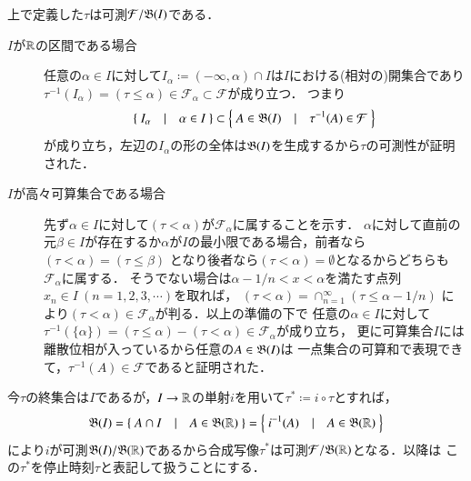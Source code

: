 	\begin{itembox}[l]{}
		\begin{rem}[停止時刻は可測]
			上で定義した$\tau$は可測$\mathcal{F}/\mathfrak{B}(I)$である．
		\end{rem}
	\end{itembox}
	\begin{prf}\mbox{}
		\begin{description}
			\item[$I$が$\mathbb{R}$の区間である場合]
				任意の$\alpha \in I$に対して$I_\alpha \coloneqq (-\infty,\alpha) \cap I$は$I$における(相対の)開集合であり
				$\tau^{-1}(I_\alpha) = (\tau \leq \alpha) \in \mathcal{F}_\alpha \subset \mathcal{F}$が成り立つ．
				つまり
				\begin{align}
					\left\{\ I_\alpha\quad |\quad \alpha \in I\ \right\} \subset \left\{\ A \in \mathfrak{B}(I)\quad |\quad \tau^{-1}(A) \in \mathcal{F}\ \right\}
					\label{eq:stopping_time_mble}
				\end{align}
				が成り立ち，左辺の$I_\alpha$の形の全体は$\mathfrak{B}(I)$を生成するから$\tau$の可測性が証明された．
				
			\item[$I$が高々可算集合である場合]
				先ず$\alpha \in I$に対して$(\tau < \alpha)$が$\mathcal{F}_\alpha$に属することを示す．
				$\alpha$に対して直前の元$\beta \in I$が存在するか$\alpha$が$I$の最小限である場合，前者なら$(\tau < \alpha) = (\tau \leq \beta)$
				となり後者なら$(\tau < \alpha) = \emptyset$となるからどちらも$\mathcal{F}_\alpha$に属する．
				そうでない場合は$\alpha - 1/n < x < \alpha$を満たす点列$x_n \in I\ (n=1,2,3,\cdots)$を取れば，
				$(\tau < \alpha) = \cap_{n=1}^{\infty}(\tau \leq \alpha - 1/n)$
				により$(\tau < \alpha) \in \mathcal{F}_\alpha$が判る．以上の準備の下で
				任意の$\alpha \in I$に対して$\tau^{-1}(\{\alpha\}) = (\tau \leq \alpha) - (\tau < \alpha) \in \mathcal{F}_\alpha$が成り立ち，
				更に可算集合$I$には離散位相が入っているから任意の$A \in \mathfrak{B}(I)$は
				一点集合の可算和で表現できて，$\tau^{-1}(A) \in \mathcal{F}$であると証明された．		
		\end{description}
		\QED
	\end{prf}
	
	\begin{itembox}[l]{}
		\begin{dfn}[停止時刻の再定義]
			今$\tau$の終集合は$I$であるが，$I \rightarrow \mathbb{R}$の単射$i$を用いて$\tau^* \coloneqq i \circ \tau$とすれば，
			\begin{align}
				\borel{I}=\left\{\ A \cap I\quad |\quad A \in \borel{\R}\ \right\} = \left\{\ i^{-1}(A)\quad |\quad A \in \borel{\R}\ \right\}
			\end{align}
			により$i$が可測$\mathfrak{B}(I)/\mathfrak{B}(\mathbb{R})$であるから合成写像$\tau^*$は可測$\mathcal{F}/\mathfrak{B}(\mathbb{R})$となる．以降は
			この$\tau^*$を停止時刻$\tau$と表記して扱うことにする．
		\end{dfn}
	\end{itembox}
	
